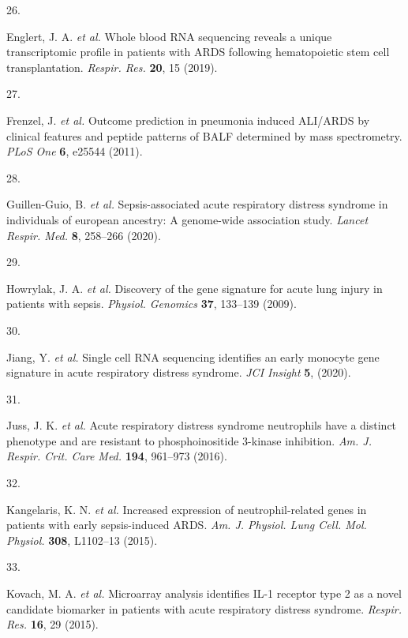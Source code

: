 \documentclass[
  11,
  a4paper,
]{article}
\newlength{\cslhangindent}
\newlength{\csllabelwidth}
\newlength{\cslentryspacingunit} %
\newenvironment{CSLReferences}[2] %
 {%
  \setlength{\parindent}{0pt}
  \ifodd #1
  \let\oldpar\par
  \def\par{\hangindent=\cslhangindent\oldpar}
  \fi
  \setlength{\parskip}{#2\cslentryspacingunit}
 }%
 {}
\newcommand{\CSLLeftMargin}[1]{\parbox[t]{\csllabelwidth}{#1}}
\newcommand{\CSLRightInline}[1]{\parbox[t]{\linewidth - \csllabelwidth}{#1}\break}
\begin{document}
\begin{CSLReferences}{0}{0}
\leavevmode{}%
\CSLLeftMargin{26. }%
\CSLRightInline{Englert, J. A. \emph{et al.} Whole blood {RNA}
sequencing reveals a unique transcriptomic profile in patients with
{ARDS} following hematopoietic stem cell transplantation. \emph{Respir.
Res.} \textbf{20}, 15 (2019).}

\leavevmode{}%
\CSLLeftMargin{27. }%
\CSLRightInline{Frenzel, J. \emph{et al.} Outcome prediction in
pneumonia induced {ALI/ARDS} by clinical features and peptide patterns
of {BALF} determined by mass spectrometry. \emph{PLoS One} \textbf{6},
e25544 (2011).}

\leavevmode{}%
\CSLLeftMargin{28. }%
\CSLRightInline{Guillen-Guio, B. \emph{et al.} Sepsis-associated acute
respiratory distress syndrome in individuals of european ancestry: A
genome-wide association study. \emph{Lancet Respir. Med.} \textbf{8},
258--266 (2020).}

\leavevmode{}%
\CSLLeftMargin{29. }%
\CSLRightInline{Howrylak, J. A. \emph{et al.} Discovery of the gene
signature for acute lung injury in patients with sepsis. \emph{Physiol.
Genomics} \textbf{37}, 133--139 (2009).}

\leavevmode{}%
\CSLLeftMargin{30. }%
\CSLRightInline{Jiang, Y. \emph{et al.} Single cell {RNA} sequencing
identifies an early monocyte gene signature in acute respiratory
distress syndrome. \emph{JCI Insight} \textbf{5}, (2020).}

\leavevmode{}%
\CSLLeftMargin{31. }%
\CSLRightInline{Juss, J. K. \emph{et al.} Acute respiratory distress
syndrome neutrophils have a distinct phenotype and are resistant to
phosphoinositide 3-kinase inhibition. \emph{Am. J. Respir. Crit. Care
Med.} \textbf{194}, 961--973 (2016).}

\leavevmode{}%
\CSLLeftMargin{32. }%
\CSLRightInline{Kangelaris, K. N. \emph{et al.} Increased expression of
neutrophil-related genes in patients with early sepsis-induced {ARDS}.
\emph{Am. J. Physiol. Lung Cell. Mol. Physiol.} \textbf{308}, L1102--13
(2015).}

\leavevmode{}%
\CSLLeftMargin{33. }%
\CSLRightInline{Kovach, M. A. \emph{et al.} Microarray analysis
identifies {IL-1} receptor type 2 as a novel candidate biomarker in
patients with acute respiratory distress syndrome. \emph{Respir. Res.}
\textbf{16}, 29 (2015).}


\end{CSLReferences}
\end{document}
